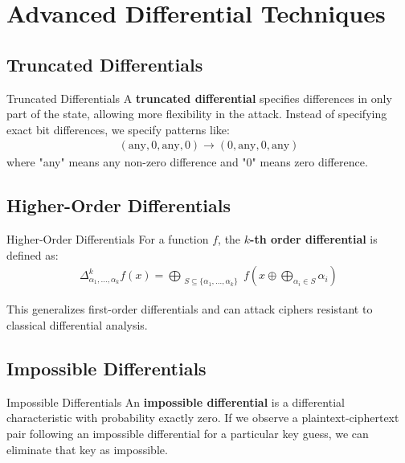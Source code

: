 \documentclass[12pt,a4paper]{article}
\theoremstyle{definition}
\begin{document}
\section{Advanced Differential Techniques}

\subsection{Truncated Differentials}

\begin{definitionbox}{Truncated Differentials}
A \textbf{truncated differential} \cite{knudsen1994truncated} specifies differences in only part of the state, allowing more flexibility in the attack. Instead of specifying exact bit differences, we specify patterns like:
\begin{align}
(\text{any}, 0, \text{any}, 0) \rightarrow (0, \text{any}, 0, \text{any})
\end{align}
where "any" means any non-zero difference and "0" means zero difference.
\end{definitionbox}

\subsection{Higher-Order Differentials}

\begin{definitionbox}{Higher-Order Differentials}
For a function $f$, the \textbf{$k$-th order differential} is defined as:
\begin{align}
\Delta^k_{\alpha_1,\ldots,\alpha_k} f(x) = \bigoplus_{\substack{S \subseteq \{\alpha_1,\ldots,\alpha_k\}}} f\left(x \oplus \bigoplus_{\alpha_i \in S} \alpha_i\right)
\end{align}

This generalizes first-order differentials and can attack ciphers resistant to classical differential analysis.
\end{definitionbox}

\subsection{Impossible Differentials}

\begin{definitionbox}{Impossible Differentials}
An \textbf{impossible differential} \cite{biham1999impossible} is a differential characteristic with probability exactly zero. If we observe a plaintext-ciphertext pair following an impossible differential for a particular key guess, we can eliminate that key as impossible.
\end{definitionbox}
\end{document}
